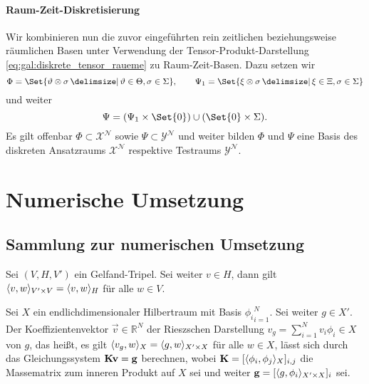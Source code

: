 \paragraph{Raum-Zeit-Diskretisierung} %
\label{par:raum_zeit_diskretisierung}

Wir kombinieren nun die zuvor eingeführten rein zeitlichen beziehungsweise räumlichen Basen unter Verwendung der Tensor-Produkt-Darstellung \cref{eq:gal:diskrete_tensor_raueme} zu Raum-Zeit-Basen.
Dazu setzen wir
\begin{equation}
    \Phi = \Set{\theta \otimes \sigma \given \theta \in \Theta, \sigma \in \Sigma}, \qquad \Psi_{1} = \Set{\xi \otimes \sigma \given \xi \in \Xi, \sigma \in \Sigma}
\end{equation}
und weiter
\begin{equation}
    \Psi = (\Psi_{1} \times \Set{ 0 }) \cup (\Set{ 0 } \times \Sigma).
\end{equation}
Es gilt offenbar $\Phi \subset \mathcal X^{\mathcal N}$ sowie $\Psi \subset \mathcal Y^{\mathcal N}$ und weiter bilden $\Phi$ und $\Psi$ eine Basis des diskreten Ansatzraums $\mathcal X^{\mathcal N}$ respektive Testraums $\mathcal Y^{\mathcal N}$.






\section{Numerische Umsetzung} %
\label{sub:grb:gv:numerische_umsetzung}

\subsection{Sammlung zur numerischen Umsetzung} %
\label{sub:sammlung_zur_numerischen_umsetzung}

\begin{Lemma}
\label{lemma:stetige_fortstetung_der_dualen_paarung}
    Sei $(V, H, V')$ ein Gelfand-Tripel.
    Sei weiter $v \in H$, dann gilt $\langle v,w\rangle_{V' \times V} = \langle v,w\rangle_{H}$ für alle $w \in V$.
\end{Lemma}

\begin{Lemma}
\label{lemma:berechnung_rieszsche_darstellung}
    Sei $X$ ein endlichdimensionaler Hilbertraum mit Basis ${\phi_i}_{i=1}^{N}$.
    Sei weiter $g \in X'$.
    Der Koeffizientenvektor $\vec{v} \in \mathbb{R}^{N}$ der Rieszschen Darstellung $v_g = \sum_{i=1}^{N} v_{i} \phi_{i} \in X$ von $g$, das heißt, es gilt $\langle v_g,w\rangle_{X} = \langle g,w\rangle_{X' \times X}$ für alle $w \in X$, lässt sich durch das Gleichungssystem $\mathbf{K}\mathbf{v} = \mathbf{g}$ berechnen, wobei $\mathbf{K} = [\langle\phi_{i},\phi_{j}\rangle_{X}]_{i,j}$ die Massematrix zum inneren Produkt auf $X$ sei und weiter $\mathbf{g} = [\langle g,\phi_{i}\rangle_{X' \times X}]_{i}$ sei.
\end{Lemma}

